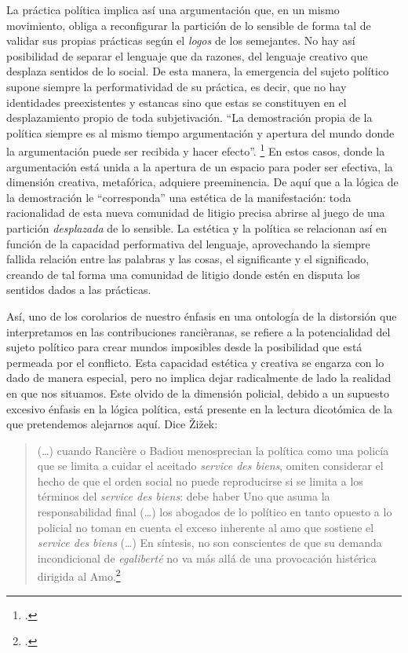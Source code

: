 La práctica política implica así una argumentación que, en un mismo movimiento, obliga a reconfigurar la partición de lo sensible de forma tal de validar sus propias prácticas según el \emph{logos} de los semejantes. No hay así posibilidad de separar el lenguaje que da razones, del lenguaje creativo que desplaza sentidos de lo social. De esta manera, la emergencia del sujeto político supone siempre la performatividad de su práctica, es decir, que no hay identidades preexistentes y estancas sino que estas se constituyen en el desplazamiento propio de toda subjetivación. \enquote{La demostración propia de la política siempre es al mismo tiempo argumentación y apertura del mundo donde la argumentación puede ser recibida y hacer efecto}. \footcite[][76]{@7064-RANCIERE2010} En estos casos, donde la argumentación está unida a la apertura de un espacio para poder ser efectiva, la dimensión creativa, metafórica, adquiere preeminencia. De aquí que a la lógica de la demostración le \enquote{corresponda} una estética de la manifestación: toda racionalidad de esta nueva comunidad de litigio precisa abrirse al juego de una partición \emph{desplazada} de lo sensible. La estética y la política se relacionan así en función de la capacidad performativa del lenguaje, aprovechando la siempre fallida relación entre las palabras y las cosas, el significante y el significado, creando de tal forma una comunidad de litigio donde estén en disputa los sentidos dados a las prácticas.

Así, uno de los corolarios de nuestro énfasis en una ontología de la distorsión que interpretamos en las contribuciones rancièranas, se refiere a la potencialidad del sujeto político para crear mundos imposibles desde la posibilidad que está permeada por el conflicto. Esta capacidad estética y creativa se engarza con lo dado de manera especial, pero no implica dejar radicalmente de lado la realidad en que nos situamos. Este olvido de la dimensión policial, debido a un supuesto excesivo énfasis en la lógica política, está presente en la lectura dicotómica de la que pretendemos alejarnos aquí. Dice Žižek:

\begin{quote}
(\ldots) cuando Rancière o Badiou menosprecian la política como una policía que se limita a cuidar el aceitado \emph{service des biens}, omiten considerar el hecho de que el orden social no puede reproducirse si se limita a los términos del \emph{service des biens}: debe haber Uno que asuma la responsabilidad final (\ldots)  los abogados de lo político en tanto opuesto a lo policial no toman en cuenta el exceso inherente al amo que sostiene el \emph{service des biens} (\ldots)  En síntesis, no son conscientes de que su demanda incondicional de \emph{egaliberté} no va más allá de una provocación histérica dirigida al Amo.\footcite[][258]{@7063-ZIZEK2005}
\end{quote}

